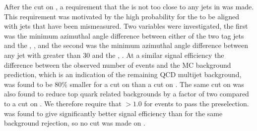 After the cut on \METsig, a requirement that the \METnoMU is not too close to any jets in \phi was made. This requirement was motivated by the high probability for the \MET to be aligned with jets that have been mismeasured. Two variables were investigated, the first was the minimum azimuthal angle difference between either of the two tag jets and the \METnoMU, \jetmetdphileading, and the second was the minimum azimuthal angle difference between any jet with \pt greater than 30 \GeV and the \METnoMU, \jetmetdphi. At a similar signal efficiency the difference between the observed number of events and the \ac{MC} background prediction, which is an indication of the remaining \ac{QCD} multijet background, was found to be 80\% smaller for a cut on \jetmetdphi than a cut on \jetmetdphileading. The same cut on \jetmetdphi was also found to reduce top quark related backgrounds by a factor of two compared to a cut on \jetmetdphileading. We therefore require that \jetmetdphi$>1.0$ for events to pass the preselection. \jetmetdphi was found to give significantly better signal efficiency than \dphijj for the same background rejection, so no cut was made on \dphijj.

